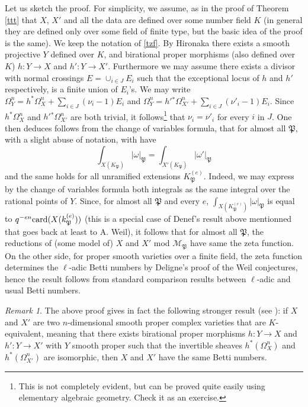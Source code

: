 \documentclass[english,12pt]{amsart}
\let\got\mathfrak
\def\gP{{\got P}}
\def\cM{{\mathcal M}}
\theoremstyle{definition}
\theoremstyle{remark}
\newtheorem{remark}[subsubsection]{Remark}
\theoremstyle{plain}
\numberwithin{equation}{subsection}
\let\got\mathfrak
\def\cM{{\mathcal M}}
\begin{document}
Let us  sketch the proof. For simplicity, we assume,
as in the proof of Theorem \ref{ttt} that
$X$, $X'$ and all the
data are defined over some number field $K$
(in general they are defined only over some field of finite type,
but the basic idea of the proof is the same).
We keep the notation of \ref{tzf}.
By Hironaka there exists a smooth projective $Y$ defined over $K$,
and birational proper morphisms (also defined over $K$)
$h : Y \rightarrow X$ and $h' : Y \rightarrow X'$. 
Furthermore we may assume
there exists a divisor with normal crossings $E = \cup_{i \in J} E_i$
such that the exceptional locus of $h$  and $h'$
respectively, is a finite union of $E_i$'s. We may write
$\Omega^n_Y = h^{*}\Omega^n_X + \sum_{i \in J}(\nu_i - 1) E_i$
and
$\Omega^n_Y = h'{}^{*}\Omega^n_{X'} + \sum_{i \in J}(\nu'_i - 1) E_i$.
Since $h^{*}\Omega^n_X$ and $h'{}^{*}\Omega^n_{X'}$ are both trivial, 
it follows\footnote{This is not completely evident, but can
be proved quite easily using
elementary algebraic geometry. Check it as  an exercise.}
that $\nu_i = \nu'_i$ for every $i$ in $J$.
One then deduces
follows from the change of variables formula, that for almost all $\gP$,
with a slight abuse of notation, with have
$$
\int_{X (K_{\gP})} \vert \omega  \vert_{\gP}
=
\int_{X' (K_{\gP})} \vert \omega' \vert_{\gP}
$$
and the same holds  for all unramified extensions $K_{\gP}^{(e)}$.
Indeed, we may express by the change of variables formula
both integrals as  the same integral over the rational points of $Y$.
Since,
for almost all $\gP$ and every $e$,
$\int_{X (K_{\gP}^{(e)})} \vert \omega  \vert_{\gP}$ is
equal to 
$q^{-en}{\rm card}(X (k^{(e)}_{\gP}))$
(this is a special case of Denef's result above mentionned
that goes back at least to A. Weil), it follows that for almost
all $\gP$, the reductions of (some model of) $X$ and $X'$ mod $\cM_{\gP}$
have same the zeta function. 
On the other side, for proper smooth varieties over a finite field,
the zeta function determines the
$\ell$-adic Betti numbers by Deligne's proof of the Weil 
conjectures, hence the result follows from standard comparison results
between $\ell$-adic and usual Betti numbers.

\begin{remark}The above proof gives in fact the following stronger
result (see \cite{batyrev}): if $X$ and $X'$ are two $n$-dimensional
smooth proper
complex varieties that are $K$-equivalent, meaning that there
exists
birational proper morphisms 
$h : Y \rightarrow X$ and $h' : Y \rightarrow X'$ with $Y$ 
smooth proper such that the invertible sheaves
$h^* (\Omega^n_X)$ and $h^* (\Omega^n_{X'})$ are isomorphic,
then $X$ and $X'$ have the same Betti numbers.
\end{remark}
\end{document}
